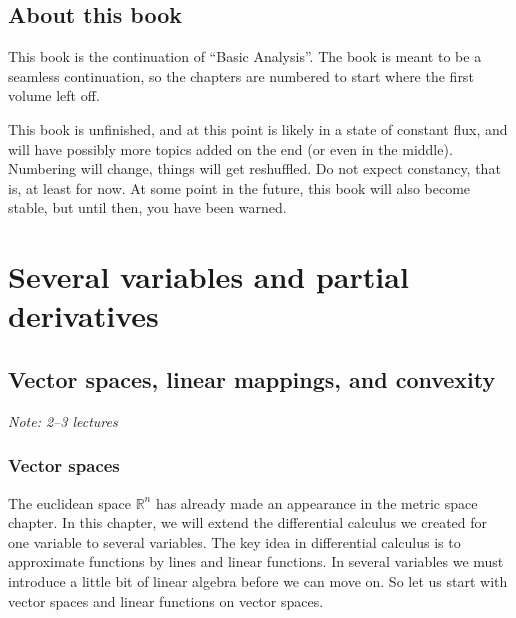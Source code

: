 \documentclass[12pt]{book}
\newcommand{\R}{{\mathbb{R}}}
\newcommand{\sectionnotes}[1]{\noindent \emph{Note: #1} \medskip \par}
\theoremstyle{plain}
\theoremstyle{remark}
\theoremstyle{definition}
\theoremstyle{exercise}
\theoremstyle{example}
\begin{document}

\section*{About this book}

This book is the continuation of ``Basic Analysis''.  The book is meant to
be a seamless continuation, so the chapters are numbered to start where the
first volume left off.

This book is unfinished, and at this point is likely in a state of
constant flux, and will have possibly more topics added on the end (or even
in the middle).
Numbering will
change, things will get reshuffled.  Do not expect constancy, that is,
at least for now.  At
some point in the future, this book will also become stable, but until then,
you have been warned.



\chapter{Several variables and partial derivatives} \label{pd:chapter}



\section{Vector spaces, linear mappings, and convexity}
\label{sec:vectorspaces}

\sectionnotes{2--3 lectures}

\subsection{Vector spaces}

The euclidean space $\R^n$ has already made an appearance in the metric
space chapter.  In this chapter, we will extend the differential calculus
we created for one variable to several variables.  The key idea in
differential calculus is to approximate functions by lines and linear
functions.  In several variables we must introduce a little bit of linear
algebra before we can move on.  So
let us start with vector spaces and linear functions on vector spaces.
\end{document}
